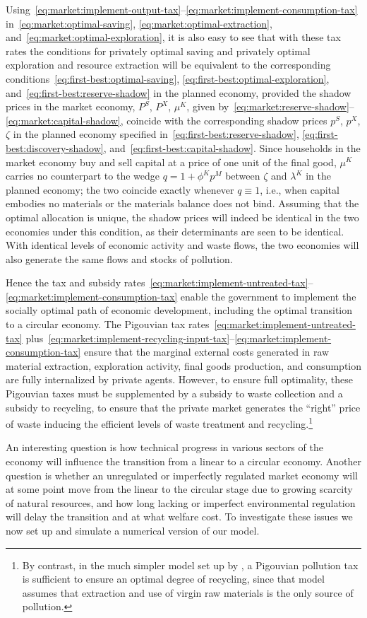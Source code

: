 Using~\eqref{eq:market:implement-output-tax}--\eqref{eq:market:implement-consumption-tax} in~\eqref{eq:market:optimal-saving}, \eqref{eq:market:optimal-extraction}, and~\eqref{eq:market:optimal-exploration}, it is also easy to see that with these tax rates the conditions for privately optimal saving and privately optimal exploration and resource extraction will be equivalent to the corresponding conditions~\eqref{eq:first-best:optimal-saving}, \eqref{eq:first-best:optimal-exploration}, and~\eqref{eq:first-best:reserve-shadow} in the planned economy, provided the shadow prices in the market economy, $P^S$, $P^X$, $\mu^K$, given by~\eqref{eq:market:reserve-shadow}--\eqref{eq:market:capital-shadow}, coincide with the corresponding shadow prices $p^S$, $p^X$, $\zeta$ in the planned economy specified in~\eqref{eq:first-best:reserve-shadow}, \eqref{eq:first-best:discovery-shadow}, and~\eqref{eq:first-best:capital-shadow}. Since households in the market economy buy and sell capital at a price of one unit of the final good, $\mu^K$ carries no counterpart to the wedge $q=1+\phi^Kp^M$ between $\zeta$ and $\lambda^K$ in the planned economy; the two coincide exactly whenever $q\equiv1$, i.e., when capital embodies no materials or the materials balance does not bind. Assuming that the optimal allocation is unique, the shadow prices will indeed be identical in the two economies under this condition, as their determinants are seen to be identical. With identical levels of economic activity and waste flows, the two economies will also generate the same flows and stocks of pollution.

Hence the tax and subsidy rates~\eqref{eq:market:implement-untreated-tax}--\eqref{eq:market:implement-consumption-tax} enable the government to implement the socially optimal path of economic development, including the optimal transition to a circular economy. The Pigouvian tax rates~\eqref{eq:market:implement-untreated-tax} plus~\eqref{eq:market:implement-recycling-input-tax}--\eqref{eq:market:implement-consumption-tax} ensure that the marginal external costs generated in raw material extraction, exploration activity, final goods production, and consumption are fully internalized by private agents. However, to ensure full optimality, these Pigouvian taxes must be supplemented by a subsidy to waste collection and a subsidy to recycling, to ensure that the private market generates the ``right'' price of waste inducing the efficient levels of waste treatment and recycling.\footnote{By contrast, in the much simpler model set up by \textcite{sorensen2018}, a Pigouvian pollution tax is sufficient to ensure an optimal degree of recycling, since that model assumes that extraction and use of virgin raw materials is the only source of pollution.}

An interesting question is how technical progress in various sectors of the economy will influence the transition from a linear to a circular economy. Another question is whether an unregulated or imperfectly regulated market economy will at some point move from the linear to the circular stage due to growing scarcity of natural resources, and how long lacking or imperfect environmental regulation will delay the transition and at what welfare cost. To investigate these issues we now set up and simulate a numerical version of our model.
